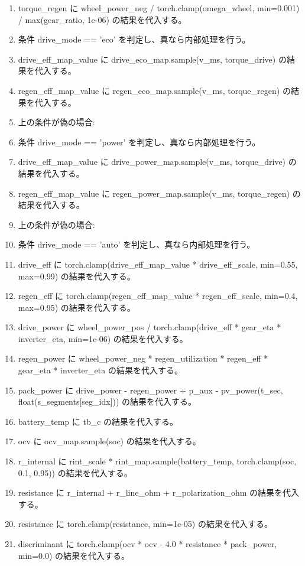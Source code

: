 \documentclass[a4paper,11pt]{article}
\begin{document}
\begin{enumerate}[leftmargin=1.8em]
\item   torque\_regen に wheel\_power\_neg / torch.clamp(omega\_wheel, min=0.001) / max(gear\_ratio, 1e-06) の結果を代入する。
\item   条件 drive\_mode == 'eco' を判定し、真なら内部処理を行う。
\item     drive\_eff\_map\_value に drive\_eco\_map.sample(v\_ms, torque\_drive) の結果を代入する。
\item     regen\_eff\_map\_value に regen\_eco\_map.sample(v\_ms, torque\_regen) の結果を代入する。
\item     上の条件が偽の場合:
\item     条件 drive\_mode == 'power' を判定し、真なら内部処理を行う。
\item       drive\_eff\_map\_value に drive\_power\_map.sample(v\_ms, torque\_drive) の結果を代入する。
\item       regen\_eff\_map\_value に regen\_power\_map.sample(v\_ms, torque\_regen) の結果を代入する。
\item       上の条件が偽の場合:
\item       条件 drive\_mode == 'auto' を判定し、真なら内部処理を行う。
\item   drive\_eff に torch.clamp(drive\_eff\_map\_value * drive\_eff\_scale, min=0.55, max=0.99) の結果を代入する。
\item   regen\_eff に torch.clamp(regen\_eff\_map\_value * regen\_eff\_scale, min=0.4, max=0.95) の結果を代入する。
\item   drive\_power に wheel\_power\_pos / torch.clamp(drive\_eff * gear\_eta * inverter\_eta, min=1e-06) の結果を代入する。
\item   regen\_power に wheel\_power\_neg * regen\_utilization * regen\_eff * gear\_eta * inverter\_eta の結果を代入する。
\item   pack\_power に drive\_power - regen\_power + p\_aux - pv\_power(t\_sec, float(s\_segments[seg\_idx])) の結果を代入する。
\item   battery\_temp に tb\_c の結果を代入する。
\item   ocv に ocv\_map.sample(soc) の結果を代入する。
\item   r\_internal に rint\_scale * rint\_map.sample(battery\_temp, torch.clamp(soc, 0.1, 0.95)) の結果を代入する。
\item   resistance に r\_internal + r\_line\_ohm + r\_polarization\_ohm の結果を代入する。
\item   resistance に torch.clamp(resistance, min=1e-05) の結果を代入する。
\item   discriminant に torch.clamp(ocv * ocv - 4.0 * resistance * pack\_power, min=0.0) の結果を代入する。
            \end{enumerate}
\end{document}
